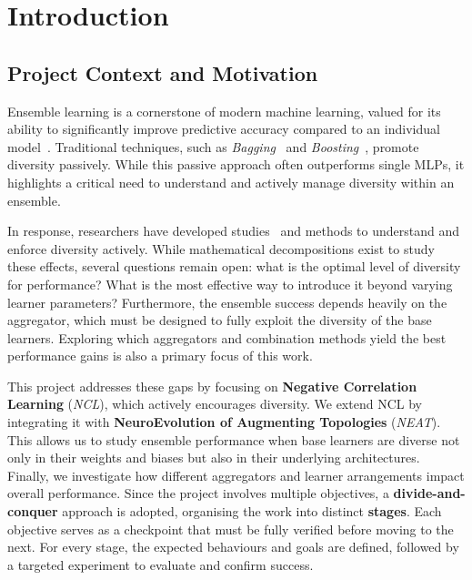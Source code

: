 \section{Introduction}
\label{sec:introduction}


\subsection{Project Context and Motivation}
Ensemble learning is a cornerstone of modern machine learning, valued for its ability to significantly improve predictive accuracy compared to an individual model~\cite{hansen2002neural}. Traditional techniques, such as \textit{Bagging}~\cite{breiman1996bagging} and \textit{Boosting}~\cite{freund1997decision}, promote diversity passively. While this passive approach often outperforms single MLPs, it highlights a critical need to understand and actively manage diversity within an ensemble. 

In response, researchers have developed studies~\cite{wood2023unified} and methods to understand and enforce diversity actively. While mathematical decompositions exist to study these effects, several questions remain open: what is the optimal level of diversity for performance? What is the most effective way to introduce it beyond varying learner parameters? Furthermore, the ensemble success depends heavily on the aggregator, which must be designed to fully exploit the diversity of the base learners. Exploring which aggregators and combination methods yield the best performance gains is also a primary focus of this work. 

This project addresses these gaps by focusing on \textbf{Negative Correlation Learning} (\textit{NCL}), which actively encourages diversity. We extend NCL by integrating it with \textbf{NeuroEvolution of Augmenting Topologies} (\textit{NEAT}). This allows us to study ensemble performance when base learners are diverse not only in their weights and biases but also in their underlying architectures. Finally, we investigate how different aggregators and learner arrangements impact overall performance. Since the project involves multiple objectives, a \textbf{divide-and-conquer} approach is adopted, organising the work into distinct \textbf{stages}. Each objective serves as a checkpoint that must be fully verified before moving to the next. For every stage, the expected behaviours and goals are defined, followed by a targeted experiment to evaluate and confirm success. 



